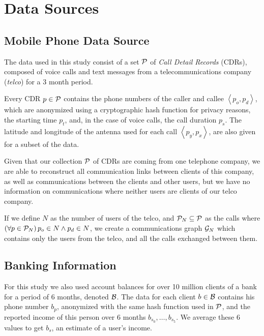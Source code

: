 \section{Data Sources}\label{data_sources}

\subsection{Mobile Phone Data Source}

The data used in this study consist of a set $\mathcal{P}$ of \textit{Call Detail Records} (CDRs), composed of voice calls and text messages from a telecommunications company (\textit{telco}) for a 3 month period.

Every CDR $p \in \mathcal{P}$ contains the phone numbers of the caller and callee $\left< p_o, p_d \right>$, which are anonymized using a cryptographic hash function for privacy reasons, the starting time $p_t$, and, in the case of voice calls, the call duration $p_s$. The latitude and longitude of the antenna used for each call $\left< p_y, p_x \right>$, are also given for a subset of the data.

Given that our collection $\mathcal{P}$ of CDRs are coming from one telephone company, we are able to reconstruct all communication links between clients of this company, as well as communications between the clients and other users, but we have no information on communications where neither users are clients of our telco company.

If we define $N$ as the number of users of the telco, and $\mathcal{P}_N \subseteq \mathcal{P}$ as the calls where $\left( \forall p \in \mathcal{P}_N \right) p_o \in N \wedge p_d \in N$, we create a communications graph $\mathcal{G}_N$ which contains only the users from the telco, and all the calls exchanged between them.


\subsection{Banking Information}

For this study we also used account balances for over 10 million clients of a bank for a period of 6 months, denoted $\mathcal{B}$. The data for each client $b \in \mathcal{B}$ contains his phone number $b_p$, anonymized with the same hash function used in $\mathcal{P}$, and the reported income of this person over 6 months $b_{s_0}, \ldots, b_{s_5}$. We average these 6 values to get $b_s$, an estimate of a user's income.

